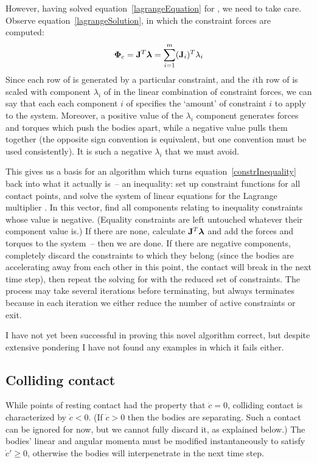 However, having solved equation~\ref{lagrangeEquation} for \ve{\lambda}, we need to take care.
Observe equation~\ref{lagrangeSolution}, in which the constraint forces are computed:
\begin{equation}
\ve{\Phi}_c = \m{J}^T\ve{\lambda} = \sum_{i=1}^{m} (\ve{J}_i)^T \lambda_i
\end{equation}
Since each row of  is generated by a particular constraint, and the $i$th row of  is
scaled with component $\lambda_i$ of \ve{\lambda} in the linear combination of constraint forces,
we can say that each each component $i$ of \ve{\lambda} specifies the `amount' of constraint $i$
to apply to the system. Moreover, a positive value of the $\lambda_i$ component generates
forces and torques which push the bodies apart, while a negative value pulls them together (the
opposite sign convention is equivalent, but one convention must be used consistently). It is such
a negative $\lambda_i$ that we must avoid.

This gives us a basis for an algorithm which turns equation~\ref{constrInequality} back into what
it actually is~-- an inequality: set up constraint functions for all contact points, and solve the
system of linear equations for the Lagrange multiplier \ve{\lambda}. In this vector, find all
components relating to inequality constraints whose value is negative. (Equality constraints
are left untouched whatever their \ve{\lambda} component value is.)
If there are none, calculate $\m{J}^T\ve{\lambda}$ and add the forces and torques to the system~--
then we are done. If there are negative components, completely discard the constraints to which
they belong (since the bodies are accelerating away from each other in this point, the contact
will break in the next time step), then repeat the solving for \ve{\lambda} with the reduced set
of constraints. The process may take several iterations before terminating, but always terminates
because in each iteration we either reduce the number of active constraints or exit.

I have not yet been successful in proving this novel algorithm correct, but despite extensive
pondering I have not found any examples in which it fails either.

\subsection{Colliding contact\label{collidingContact}}

While points of resting contact had the property that $\dot{c} = 0$, colliding contact is
characterized by $\dot{c} < 0$. (If $\dot{c} > 0$ then the bodies are separating.
Such a contact can be ignored for now, but we cannot fully discard it, as explained
below.) The bodies' linear and angular momenta must be modified instantaneously to satisfy
$\dot{c}' \ge 0$, otherwise the bodies will interpenetrate in the next time step.


